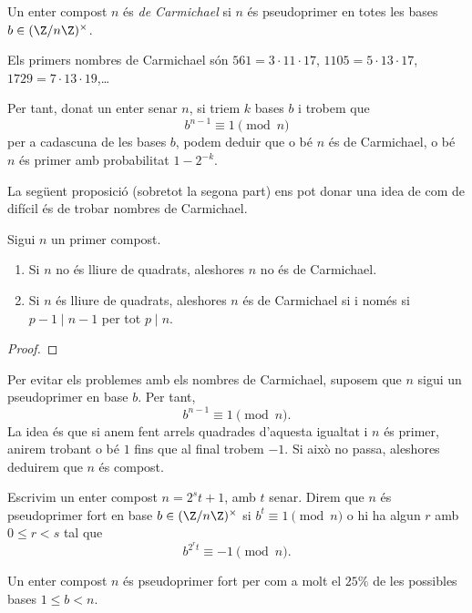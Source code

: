  \begin{definition}
 Un enter compost $n$ és \emph{de Carmichael} si $n$ és pseudoprimer en totes les bases $b\in(\Z/n\Z)^\times$.
 \end{definition}
 
 Els primers nombres de Carmichael són $561=3\cdot 11\cdot 17$, $1105=5\cdot 13\cdot 17$, $1729 = 7\cdot 13\cdot 19$,\ldots
 
 Per tant, donat un enter senar $n$, si triem $k$ bases $b$ i trobem que
 \[
 b^{n-1}\equiv 1\pmod n
 \]
 per a cadascuna de les bases $b$, podem deduir que o bé $n$ és de Carmichael, o bé $n$ és primer amb probabilitat $1-2^{-k}$.
 
 La següent proposició (sobretot la segona part) ens pot donar una idea de com de difícil és de trobar nombres de Carmichael.
 \begin{proposition}
  Sigui $n$ un primer compost.
  \begin{enumerate}
      \item Si $n$ no és lliure de quadrats, aleshores $n$ no és de Carmichael.
      \item Si $n$ és lliure de quadrats, aleshores $n$ és de Carmichael si i només si $p-1\mid n-1$ per tot $p\mid n$.
  \end{enumerate}
 \end{proposition}
 \begin{proof}
 \end{proof}

 
 Per evitar els problemes amb els nombres de Carmichael, suposem que $n$ sigui un pseudoprimer en base $b$. Per tant,
 \[
 b^{n-1}\equiv 1\pmod n.
 \]
 La idea és que si anem fent arrels quadrades d'aquesta igualtat i $n$ és primer, anirem trobant o bé $1$ fins que al final trobem $-1$. Si això no passa, aleshores deduirem que $n$ és compost.
 
 \begin{definition}
 Escrivim un enter compost $n=2^st+1$, amb $t$ senar. Direm que $n$ és pseudoprimer fort en base $b\in(\Z/n\Z)^\times$ si $b^t\equiv 1\pmod n$ o hi ha algun $r$ amb $0\leq r<s$ tal que
 \[
 b^{2^rt}\equiv -1\pmod n.
 \]
 \end{definition}
 
 \begin{proposition}
 \label{prop:ppf}
  Un enter compost $n$ és pseudoprimer fort per com a molt el $25 \%$ de les possibles bases $1\leq b<n$.
 \end{proposition}
 
